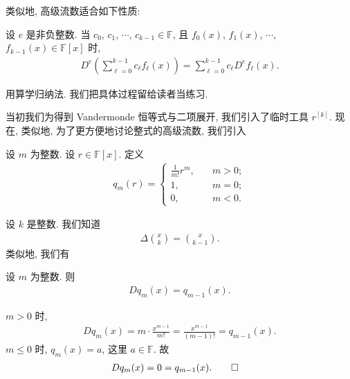 类似地, 高级流数适合如下性质:

\begin{proposition}
    设 $e$ 是非负整数. 当 $c_0$, $c_1$, $\cdots$, $c_{k-1} \in \mathbb{F}$, 且 $f_0 (x)$, $f_1 (x)$, $\cdots$, $f_{k-1} (x) \in \mathbb{F}[x]$ 时,
    \begin{align*}
        D^e \left( \sum_{\ell = 0}^{k-1} c_\ell f_\ell (x) \right)
        = \sum_{\ell = 0}^{k-1} c_\ell D^e f_\ell (x).
    \end{align*}
\end{proposition}

\begin{pf}
    用算学归纳法. 我们把具体过程留给读者当练习.
\end{pf}

当初我们为得到 Vandermonde 恒等式与二项展开, 我们引入了临时工具 $r^{[k]}$. 现在, 类似地, 为了更方便地讨论整式的高级流数, 我们引入

\begin{definition}
    设 $m$ 为整数. 设 $r \in \mathbb{F}[x]$. 定义
    \begin{align*}
        q_m (r) = \begin{cases}
            \frac{1}{m!} r^m, & \quad m > 0; \\
            1,                & \quad m = 0; \\
            0,                & \quad m < 0.
        \end{cases}
    \end{align*}
\end{definition}

设 $k$ 是整数. 我们知道
\begin{align*}
    \Delta \binom{x}{k} = \binom{x}{k - 1}.
\end{align*}
类似地, 我们有

\begin{proposition}
    设 $m$ 为整数. 则
    \begin{align*}
        D q_m (x) = q_{m-1} (x).
    \end{align*}
\end{proposition}

\begin{pf}
    $m > 0$ 时,
    \begin{align*}
        D q_m (x) = m \cdot \frac{x^{m-1}}{m!} = \frac{x^{m-1}}{(m-1)!} = q_{m-1} (x).
    \end{align*}
    $m \leq 0$ 时, $q_m (x) = a$, 这里 $a \in \mathbb{F}$. 故
    \begin{align*}
         & D q_m (x) = 0 = q_{m-1} (x). \qedhere
    \end{align*}
\end{pf}

